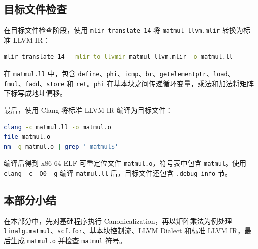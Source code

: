 \subsection{目标文件检查}

在目标文件检查阶段，使用 \texttt{mlir-translate-14} 将 \texttt{matmul\_llvm.mlir} 转换为标准 LLVM IR：

\begin{lstlisting}[language=bash]
mlir-translate-14 --mlir-to-llvmir matmul_llvm.mlir -o matmul.ll
\end{lstlisting}

在 \texttt{matmul.ll} 中，包含 \texttt{define}、\texttt{phi}、\texttt{icmp}、\texttt{br}、\texttt{getelementptr}、\texttt{load}、\texttt{fmul}、\texttt{fadd}、\texttt{store} 和 \texttt{ret}。\texttt{phi} 在基本块之间传递循环变量，乘法和加法将矩阵下标写成地址偏移。



最后，使用 Clang 将标准 LLVM IR 编译为目标文件：

\begin{lstlisting}[language=bash]
clang -c matmul.ll -o matmul.o
file matmul.o
nm -g matmul.o | grep ' matmul$'
\end{lstlisting}

编译后得到 x86-64 ELF 可重定位文件 \texttt{matmul.o}，符号表中包含 \texttt{matmul}。使用 \texttt{clang -c -O0 -g} 编译 \texttt{matmul.ll} 后，目标文件还包含 \texttt{.debug\_info} 节。


\subsection{本部分小结}

在本部分中，先对基础程序执行 Canonicalization，再以矩阵乘法为例处理 \texttt{linalg.matmul}、\texttt{scf.for}、基本块控制流、LLVM Dialect 和标准 LLVM IR，最后生成 \texttt{matmul.o} 并检查 \texttt{matmul} 符号。
